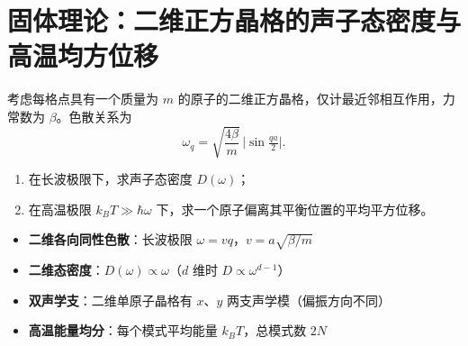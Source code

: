 \section{固体理论：二维正方晶格的声子态密度与高温均方位移}
\label{sec:2d-square-dos}

\begin{modelbox}[题目：二维正方晶格的态密度与热涨落]
考虑每格点具有一个质量为 $m$ 的原子的二维正方晶格，仅计最近邻相互作用，力常数为 $\beta$。色散关系为
\[
\omega_q = \sqrt{\frac{4\beta}{m}}\,\bigl|\sin\tfrac{qa}{2}\bigr|.
\]
\begin{enumerate}
    \item 在长波极限下，求声子态密度 $D(\omega)$；
    \item 在高温极限 $k_BT\gg\hbar\omega$ 下，求一个原子偏离其平衡位置的平均平方位移。
\end{enumerate}
\end{modelbox}

\begin{tipbox}[考点快速分析]
\begin{itemize}
    \item \textbf{二维各向同性色散}：长波极限 $\omega=vq$，$v=a\sqrt{\beta/m}$
    \item \textbf{二维态密度}：$D(\omega)\propto\omega$（$d$ 维时 $D\propto\omega^{d-1}$）
    \item \textbf{双声学支}：二维单原子晶格有 $x$、$y$ 两支声学模（偏振方向不同）
    \item \textbf{高温能量均分}：每个模式平均能量 $k_BT$，总模式数 $2N$
\end{itemize}
\end{tipbox}

